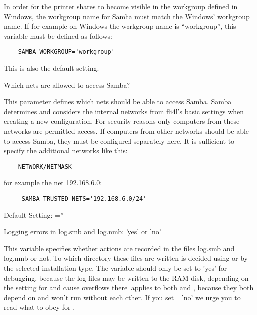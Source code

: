 \begin{description}

    In order for the printer shares to become visible in the workgroup defined
    in Windows, the workgroup name for Samba must match the Windows' workgroup name.
    If for example on Windows the workgroup name is ``workgroup'', this variable must
    be defined as follows:

\begin{example}
\begin{verbatim}
    SAMBA_WORKGROUP='workgroup'
\end{verbatim}
\end{example}

    This is also the default setting.


    Which nets are allowed to access Samba?

    This parameter defines which nets should be able to access Samba.
    Samba determines and considers the internal networks from fli4l's
    basic settings when creating a new configuration. For security reasons
    only computers from these networks are permitted access.
    If computers from other networks should be able to access Samba, they
    must be configured separately here. It is sufficient to specify the
    additional networks like this:

\begin{example}
\begin{verbatim}
    NETWORK/NETMASK
\end{verbatim}
\end{example}

     for example the net 192.168.6.0:

\begin{example}
\begin{verbatim}
     SAMBA_TRUSTED_NETS='192.168.6.0/24'
\end{verbatim}
\end{example}

    Default Setting: =''


 Logging errors in log.smb and log.nmb:
    'yes' or 'no'

    This variable specifies whether actions are recorded in the files
    log.smb and log.nmb or not. To which directory these files are written
    is decided using 
    or by the selected installation type. The variable should only
    be set to 'yes' for debugging, because the log files may be written
    to the RAM disk, depending on the setting for 
    and cause overflows there.  applies to both
     and ,
    because they both depend on and won't run without each other.
    If you set ='no' we urge you to read what to obey for
    .


\end{description}
